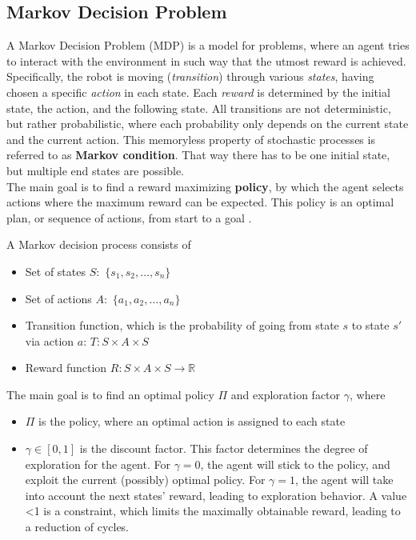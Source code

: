 \documentclass[a4paper]{article}
\begin{document}
	\subsection{Markov Decision Problem}
	A Markov Decision Problem (MDP) is a model for problems, where an agent tries to interact with the environment in such way that the utmost reward is achieved. Specifically, the robot is moving (\textit{transition}) through various \textit{states}, having chosen a specific \textit{action} in each state. Each \textit{reward} is determined by the initial state, the action, and the following state. 
	All transitions are not deterministic, but rather probabilistic, where each probability only depends on the current state and the current action. This memoryless property of stochastic processes is referred to as \textbf{Markov condition}. That way there has to be one initial state, but multiple end states are possible.\\
	The main goal is to find a reward maximizing \textbf{policy}, by which the agent selects actions where the maximum reward can be expected. This policy is an optimal plan, or sequence of actions, from start to a goal \citep{Lecture}.
	\par A Markov decision process consists of
	\begin{itemize}
		\item Set of states $S:$ $\{s_1,s_2,\dots, s_n\}$
		\item Set of actions $A:$  $\{a_1,a_2,\dots, a_n\}$ 
		\item Transition function, which is the probability of going from state $s$ to state $s'$ via action $a$: $T: S\times A \times S$
		\item  Reward function $R: S\times A \times S \rightarrow \mathbb{R}$
	\end{itemize}
	The main goal is to find an optimal policy $\Pi$ and exploration factor $\gamma$, where
	\begin{itemize}
		\item $\Pi$ is the policy, where an optimal action is assigned to each state
		\item $\gamma \in [0,1]$ is the discount factor. This factor determines the degree of exploration for the agent. For $\gamma=0$, the agent will stick to the policy, and exploit the current (possibly) optimal policy. For $\gamma=1$, the agent will take into account the next states' reward, leading to exploration behavior. A value <1 is a constraint, which limits the maximally obtainable reward, leading to a reduction of cycles.
	\end{itemize}
\end{document}
